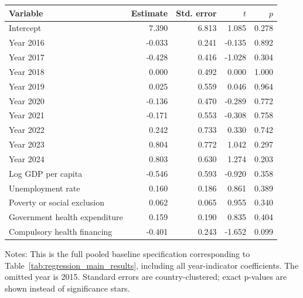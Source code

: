 \begin{tabular}{@{}lrrrr@{}}
\toprule
Variable & Estimate & Std. error & \(t\) & \(p\) \\
\midrule
Intercept & 7.390 & 6.813 & 1.085 & 0.278 \\
Year 2016 & -0.033 & 0.241 & -0.135 & 0.892 \\
Year 2017 & -0.428 & 0.416 & -1.028 & 0.304 \\
Year 2018 & 0.000 & 0.492 & 0.000 & 1.000 \\
Year 2019 & 0.025 & 0.559 & 0.046 & 0.964 \\
Year 2020 & -0.136 & 0.470 & -0.289 & 0.772 \\
Year 2021 & -0.171 & 0.553 & -0.308 & 0.758 \\
Year 2022 & 0.242 & 0.733 & 0.330 & 0.742 \\
Year 2023 & 0.804 & 0.772 & 1.042 & 0.297 \\
Year 2024 & 0.803 & 0.630 & 1.274 & 0.203 \\
Log GDP per capita & -0.546 & 0.593 & -0.920 & 0.358 \\
Unemployment rate & 0.160 & 0.186 & 0.861 & 0.389 \\
Poverty or social exclusion & 0.062 & 0.065 & 0.955 & 0.340 \\
Government health expenditure & 0.159 & 0.190 & 0.835 & 0.404 \\
Compulsory health financing & -0.401 & 0.243 & -1.652 & 0.099 \\
\bottomrule
\end{tabular}
\par\vspace{0.3em}
\begin{minipage}{0.96\textwidth}
\footnotesize Notes: This is the full pooled baseline specification corresponding to Table~\ref{tab:regression_main_results}, including all year-indicator coefficients. The omitted year is 2015. Standard errors are country-clustered; exact p-values are shown instead of significance stars.
\end{minipage}
